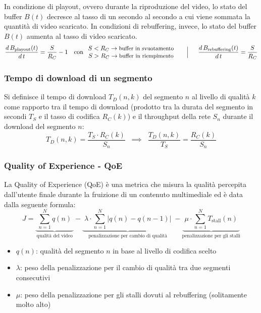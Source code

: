 In condizione di playout, ovvero durante la riproduzione del video, lo stato del buffer \(B(t)\) decresce al tasso di
un secondo al secondo a cui viene sommata la quantità di video scaricato. In condizioni di rebuffering, invece, lo stato
del buffer \(B(t)\) aumenta al tasso di video scaricato.
\[\frac{d \, B_\text{playout}(t)}{d \, t} = \frac{S}{R_C} - 1 \quad \text{con} \; \begin{array}{c}
	S < R_C \rightarrow \text{\small buffer in svuotamento} \\
	S > R_C \rightarrow \text{\small buffer in riempimento}
\end{array} \quad\;\;\Big|\;\;\quad \frac{d \, B_\text{rebuffering}(t)}{d \, t} = \frac{S}{R_C}\]

\subsubsection*{Tempo di download di un segmento}
Si definisce il tempo di download \(T_D(n,k)\) del segmento \(n\) al livello di qualità \(k\) come rapporto tra il tempo
di download (prodotto tra la durata del segmento in secondi \(T_S\) e il tasso di codifica \(R_C(k)\)) e il throughput della
rete \(S_n\) durante il download del segmento \(n\):
\[T_D(n,k) = \frac{T_S \cdot R_C(k)}{S_n} \;\; \implies \;\; \frac{T_D(n,k)}{T_S} = \frac{R_C(k)}{S_n}\]

\subsubsection*{Quality of Experience - QoE}
La Quality of Experience (QoE) è una metrica che misura la qualità percepita dall'utente finale durante la fruizione
di un contenuto multimediale ed è data dalla seguente formula:
\[J = \underbrace{\; \sum_{n=1}^{N} q(n) \;}_\text{qualità del video} - \underbrace{\; \lambda \cdot \sum_{n=1}^{N} \left| q(n) - q(n-1) \right| \;}_\text{penalizzazione per cambio di qualità} - \underbrace{\; \mu \cdot \sum_{n=1}^{N} T_\text{stall}(n) \;}_\text{penalizzazione per gli stalli} \]
\begin{itemize}
	\item \(q(n)\): qualità del segmento \(n\) in base al livello di codifica scelto
	\item \(\lambda\): peso della penalizzazione per il cambio di qualità tra due segmenti consecutivi
	\item \(\mu\): peso della penalizzazione per gli stalli dovuti al rebuffering (solitamente molto alto)	
\end{itemize}
